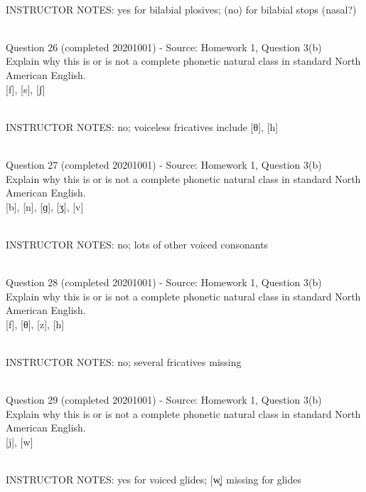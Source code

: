 \documentclass[12pt]{article}
\begin{document}
~\\
INSTRUCTOR NOTES: yes for bilabial plosives; (no) for bilabial stops (nasal?)


~\\

{\large Question 26} (completed 20201001) - Source: Homework 1, Question 3(b)\\

Explain why this is or is not a complete phonetic natural class in standard North American English.\\

{[f]}, {[s]}, {[ʃ]}


~\\
INSTRUCTOR NOTES: no; voiceless fricatives include [θ], [h]


~\\

{\large Question 27} (completed 20201001) - Source: Homework 1, Question 3(b)\\

Explain why this is or is not a complete phonetic natural class in standard North American English.\\

{[b]}, {[n]}, {[ɡ]}, {[ʒ]}, {[v]}


~\\
INSTRUCTOR NOTES: no; lots of other voiced consonants


~\\

{\large Question 28} (completed 20201001) - Source: Homework 1, Question 3(b)\\

Explain why this is or is not a complete phonetic natural class in standard North American English.\\

{[f]}, {[θ]}, {[z]}, {[h]}


~\\
INSTRUCTOR NOTES: no; several fricatives missing


~\\

{\large Question 29} (completed 20201001) - Source: Homework 1, Question 3(b)\\

Explain why this is or is not a complete phonetic natural class in standard North American English.\\

{[j]}, {[w]}


~\\
INSTRUCTOR NOTES: yes for voiced glides; [w̥] missing for glides
\end{document}
